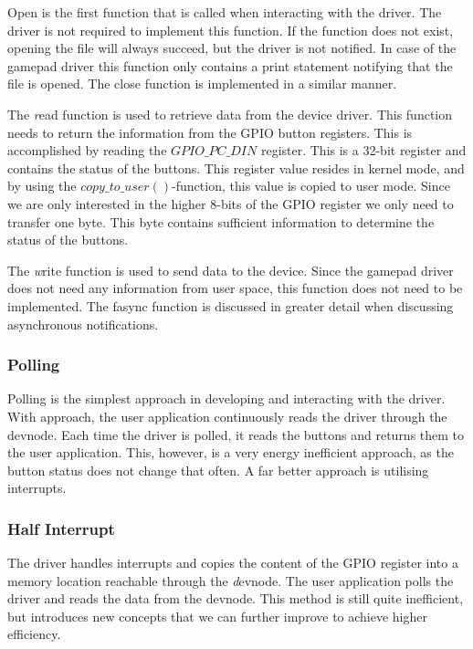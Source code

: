 Open is the first function that is called when interacting with the driver. The driver is not required to implement this function. If the function does not exist, opening the file will always succeed, but the driver is not notified. In case of the gamepad driver this function only contains a print statement notifying that the file is opened. The close function is implemented in a similar manner. 

The \emph read function is used to retrieve data from the device driver. This function needs to return the information from the GPIO button registers. This is accomplished by reading the $GPIO\_PC\_DIN$ register. This is a 32-bit register and contains the status of the buttons. This register value resides in kernel mode, and by using the  $copy\_to\_user()$-function, this value is copied to user mode. Since we are only interested in the higher 8-bits of the GPIO register we only need to transfer one byte. This byte contains sufficient information to determine the status of the buttons. 

The \emph write function is used to send data to the device. Since the gamepad driver does not need any information from user space, this function does not need to be implemented. The fasync function is discussed in greater detail when discussing asynchronous notifications. 




\subsubsection{Polling}
Polling is the simplest approach in developing and interacting with the driver. With approach, the user application continuously reads the driver through the devnode. Each time the driver is polled, it reads the buttons and returns them to the user application. This, however, is a very energy inefficient approach, as the button status does not change that often. A far better approach is utilising interrupts. 


\subsubsection{Half Interrupt}
The driver handles interrupts and copies the content of the GPIO register into a memory location reachable through the {\emph devnode}. The user application polls the driver and reads the data from the devnode. This method is still quite inefficient, but introduces new concepts that we can further improve to achieve higher efficiency. 

